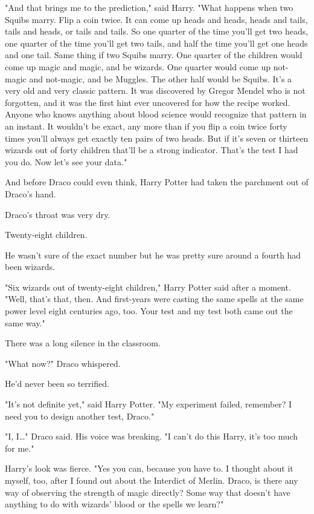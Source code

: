 "And that brings me to the prediction," said Harry. "What happens when two
Squibs marry. Flip a coin twice. It can come up heads and heads, heads and
tails, tails and heads, or tails and tails. So one quarter of the time you'll
get two heads, one quarter of the time you'll get two tails, and half the time
you'll get one heads and one tail. Same thing if two Squibs marry. One quarter
of the children would come up magic and magic, and be wizards. One quarter
would come up not-magic and not-magic, and be Muggles. The other half would be
Squibs. It's a very old and very classic pattern. It was discovered by Gregor
Mendel who is not forgotten, and it was the first hint ever uncovered for how
the recipe worked. Anyone who knows anything about blood science would
recognize that pattern in an instant. It wouldn't be exact, any more than if
you flip a coin twice forty times you'll always get exactly ten pairs of two
heads. But if it's seven or thirteen wizards out of forty children that'll be a
strong indicator. That's the test I had you do. Now let's see your data."

And before Draco could even think, Harry Potter had taken the parchment out of
Draco's hand.

Draco's throat was very dry.

Twenty-eight children.

He wasn't sure of the exact number but he was pretty sure around a fourth had
been wizards.

"Six wizards out of twenty-eight children," Harry Potter said after a moment.
"Well, that's that, then. And first-years were casting the same spells at the
same power level eight centuries ago, too. Your test and my test both came out
the same way."

There was a long silence in the classroom.

"What now?" Draco whispered.

He'd never been so terrified.

"It's not definite yet," said Harry Potter. "My experiment failed, remember? I
need you to design another test, Draco."

"I, I{\ldots}" Draco said. His voice was breaking. "I can't do this Harry, it's
too much for me."

Harry's look was fierce. "Yes you can, because you have to. I thought about it
myself, too, after I found out about the Interdict of Merlin. Draco, is there
any way of observing the strength of magic directly? Some way that doesn't have
anything to do with wizards' blood or the spells we learn?"

